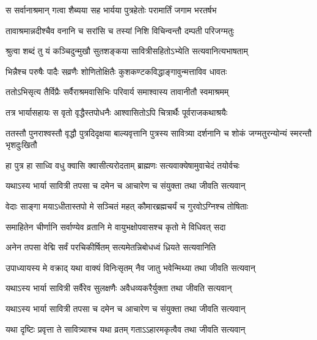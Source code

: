 \begin{center}
\twolineshloka
{स सर्वानाश्रमान् गत्वा शैब्यया सह भार्यया}
{पुत्रहेतोः परामार्तिं जगाम भरतर्षभ}

\twolineshloka
{तावाश्रमान्नदीश्चैव वनानि च सरांसि च}
{तस्यां निशि विचिन्वन्तौ दम्पती परिजग्मतुः}

\twolineshloka
{श्रुत्वा शब्दं तु यं कञ्चिदुन्मुखौ सुतशङ्कया}
{सावित्रीसहितोऽभ्येति सत्यवानित्यभाषताम्}

\twolineshloka
{भिन्नैश्च परुषैः पादैः सव्रणैः शोणितोक्षितैः}
{कुशकण्टकविद्धाङ्गावुन्मत्ताविव धावतः}

\twolineshloka
{ततोऽभिसृत्य तैर्विप्रैः सर्वैराश्रमवासिभिः}
{परिवार्य समाश्वास्य तावानीतौ स्वमाश्रमम्}

\twolineshloka
{तत्र भार्यासहायः स वृतो वृद्धैस्तपोधनैः}
{आश्वासितोऽपि चित्रार्थैः पूर्वराजकथाश्रयैः}

\threelineshloka
{ततस्तौ पुनराश्वस्तौ वृद्धौ पुत्रदिदृक्षया}
{बाल्यवृत्तानि पुत्रस्य सावित्र्या दर्शनानि च}
{शोकं जग्मतुरन्योन्यं स्मरन्तौ भृशदुःखितौ}

\twolineshloka
{हा पुत्र हा साध्वि वधु क्वासि क्वासीत्यरोदताम्}
{ब्राह्मणः सत्यवाक्येषामुवाचेदं तयोर्वचः}


\twolineshloka
{यथाऽस्य भार्या सावित्री तपसा च दमेन च}
{आचारेण च संयुक्ता तथा जीवति सत्यवान्}


\twolineshloka
{वेदाः साङ्गा मयाऽधीतास्तपो मे सञ्चितं महत्}
{कौमारब्रह्मचर्यं च गुरवोऽग्निश्च तोषिताः}

\twolineshloka
{समाहितेन चीर्णानि सर्वाण्येव व्रतानि मे}
{वायुभक्षोपवासश्च कृतो मे विधिवत् सदा}

\twolineshloka
{अनेन तपसा वेद्मि सर्वं परचिकीर्षितम्}
{सत्यमेतन्निबोधध्वं ध्रियते सत्यवानिति}


\twolineshloka
{उपाध्यायस्य मे वक्राद् यथा वाक्यं विनिःसृतम्}
{नैव जातु भवेन्मिथ्या तथा जीवति सत्यवान्}


\twolineshloka
{यथाऽस्य भार्या सावित्री सर्वैरेव सुलक्षणैः}
{अवैधव्यकरैर्युक्ता तथा जीवति सत्यवान्}


\twolineshloka
{यथाऽस्य भार्या सावित्री तपसा च दमेन च}
{आचारेण च संयुक्ता तथा जीवति सत्यवान्}


\twolineshloka
{यथा दृष्टिः प्रवृत्ता ते सावित्र्याश्च यथा व्रतम्}
{गताऽऽहारमकृत्वैव तथा जीवति सत्यवान्}


\end{center}
